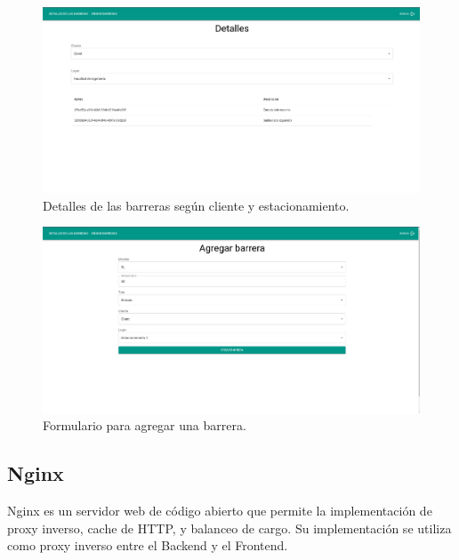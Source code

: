 \begin{figure}[bth]
    \centering
    \includegraphics[width=\textwidth]{imgs/server/admin-details.png}
    \caption{Detalles de las barreras según cliente y estacionamiento.}
    \label{fig:admin-details}
\end{figure}

\begin{figure}[bth]
    \centering
    \includegraphics[width=\textwidth]{imgs/server/add-barrier.png}
    \caption{Formulario para agregar una barrera.}
    \label{fig:add-barrier}
\end{figure}

\subsection{Nginx}

Nginx es un servidor web de código abierto que permite la implementación de proxy inverso, cache de HTTP, y balanceo de cargo.
Su implementación se utiliza como proxy inverso entre el Backend y el Frontend.

